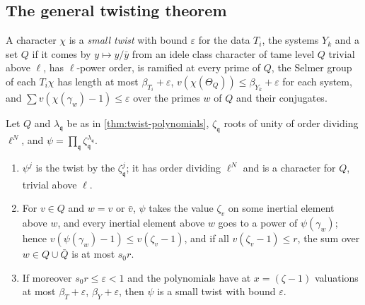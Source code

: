 \subsection{The general twisting theorem}\label{ss:twisting-general}
A character $\chi$ is a \emph{small twist} with bound $\varepsilon$ for the data $T_i$, the systems $Y_k$ and a set $Q$ if it comes by $y\mapsto y/\bar y$ from an idele class character of tame level $Q$ trivial above $\ell$, has $\ell$-power order, is
ramified at every prime of $Q$, the Selmer group of each $T_i\chi$ has length at most $\beta_{T_i}+\varepsilon$, $v(\chi(\Theta_Q))\le\beta_{Y_k}+\varepsilon$ for each system, and $\sum v(\chi(\gamma_w)-1)\le\varepsilon$ over the primes $w$ of $Q$ and their conjugates.

\begin{lemma}\label{lem:twists-roots}
Let $Q$ and $\lambda_{\mathfrak q}$ be as in \cref{thm:twist-polynomials}, $\zeta_{\mathfrak q}$ roots of unity of order dividing $\ell^N$, and $\psi=\prod_{\mathfrak q}\zeta_{\mathfrak q}^{\lambda_{\mathfrak q}}$.
\begin{enumerate}[label=\textup{(\alph*)}]
\item $\psi^j$ is the twist by the $\zeta^j_{\mathfrak q}$; it has order dividing $\ell^N$ and is a character for $Q$, trivial above $\ell$.
\item For $v\in Q$ and $w=v$ or $\bar v$, $\psi$ takes the value $\zeta_v$ on some inertial element above $w$, and every inertial element above $w$ goes to a power of $\psi(\gamma_w)$; hence $v(\psi(\gamma_w)-1)\le v(\zeta_v-1)$, and if all $v(\zeta_v-1)\le r$, the sum over $w\in Q\cup\bar Q$ is at most $s_0r$.
\item If moreover $s_0r\le\varepsilon<1$ and the polynomials have at $x=(\zeta-1)$ valuations at most $\beta_T+\varepsilon$, $\beta_Y+\varepsilon$, then $\psi$ is a small twist with bound $\varepsilon$.
\end{enumerate}
\end{lemma}

